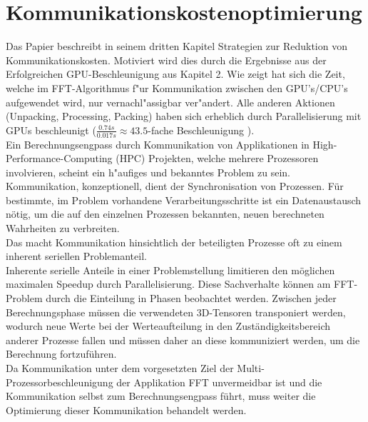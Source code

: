 \section{Kommunikationskostenoptimierung}
Das Papier \cite{mainpaper} beschreibt in seinem dritten Kapitel Strategien zur Reduktion von Kommunikationskosten. Motiviert wird dies durch die Ergebnisse aus der Erfolgreichen GPU-Beschleunigung aus Kapitel 2.
Wie \cite[Abb. 3]{mainpaper} zeigt hat sich die Zeit, welche im FFT-Algorithmus f"ur Kommunikation zwischen den GPU's/CPU's aufgewendet wird, nur vernachl"assigbar ver"andert. Alle anderen Aktionen (Unpacking, Processing, Packing) haben sich erheblich durch Parallelisierung mit GPUs beschleunigt ($ \frac{0.74s}{0.017s} \approx 43.5$-fache Beschleunigung ).\\

Ein Berechnungsengpass durch Kommunikation von Applikationen in High-Performance-Computing (HPC) Projekten, welche mehrere Prozessoren involvieren, scheint ein h"aufiges und bekanntes Problem zu sein.
Kommunikation, konzeptionell, dient der Synchronisation von Prozessen. Für bestimmte, im Problem vorhandene Verarbeitungsschritte ist ein Datenaustausch nötig, um die auf den einzelnen Prozessen bekannten, neuen berechneten Wahrheiten zu verbreiten.\\
Das macht Kommunikation hinsichtlich der beteiligten Prozesse oft zu einem inherent seriellen Problemanteil.\\
Inherente serielle Anteile in einer Problemstellung limitieren den möglichen maximalen Speedup durch Parallelisierung.
Diese Sachverhalte können am FFT-Problem durch die Einteilung in Phasen beobachtet werden. Zwischen jeder Berechnungsphase müssen die verwendeten 3D-Tensoren transponiert werden, wodurch neue Werte bei der Werteaufteilung in den Zuständigkeitsbereich anderer Prozesse fallen und müssen daher an diese kommuniziert werden, um die Berechnung fortzuführen.\\
Da Kommunikation unter dem vorgesetzten Ziel der Multi-Prozessorbeschleunigung der Applikation FFT unvermeidbar ist und die Kommunikation selbst zum Berechnungsengpass führt, muss weiter die Optimierung dieser Kommunikation behandelt werden.


